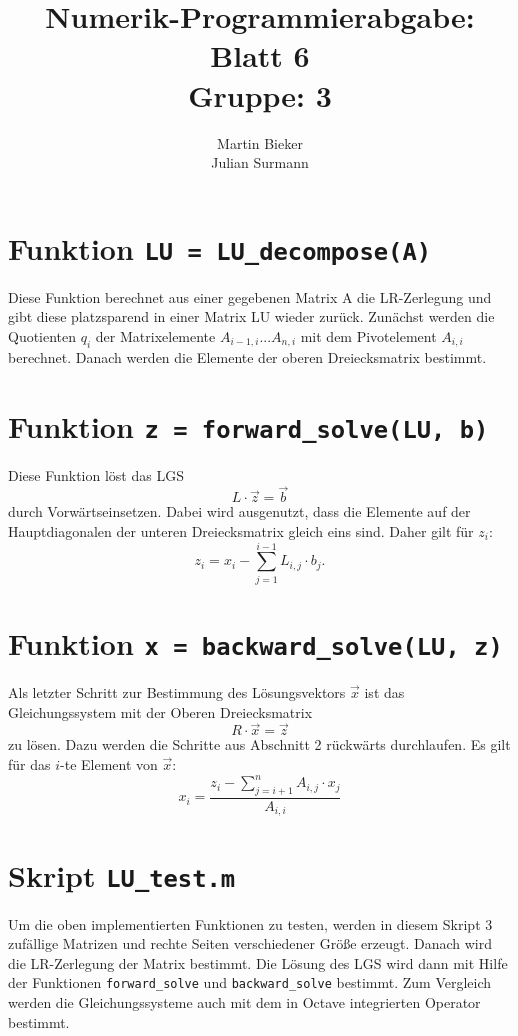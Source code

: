 \documentclass[11pt,ngerman,a4paper]{article}
\title{\textbf{Numerik-Programmierabgabe: Blatt 6}\\
Gruppe: 3}
\author{Martin Bieker\\
		Julian Surmann\\
}
\date{}
\begin{document}
\renewcommand\tablename{Tabelle}
\renewcommand\figurename{Abbildung}
\maketitle
\section{Funktion \texttt{LU = LU\_decompose(A)}}
Diese Funktion berechnet aus einer gegebenen Matrix A die LR-Zerlegung und gibt diese platzsparend in einer Matrix LU wieder zur\"uck. Zun\"achst werden die Quotienten $q_i$ der Matrixelemente $A_{i-1,i} ... A_{n,i}$ mit dem Pivotelement $A_{i,i}$ berechnet. Danach werden die Elemente der oberen Dreiecksmatrix bestimmt.


\section{Funktion \texttt{z = forward\_solve(LU, b)}}
Diese Funktion löst das LGS 
\[
L\cdot \vec z = \vec b 
\]
durch Vorw\"artseinsetzen. Dabei wird ausgenutzt, dass die Elemente auf der Hauptdiagonalen der unteren Dreiecksmatrix gleich eins sind. Daher gilt f\"ur $z_i$:
\[
z_i = x_i - \sum^{i-1}_{j=1} L_{i,j}\cdot b_j \mathrm{.}
\]



\section{Funktion \texttt{x = backward\_solve(LU, z)}}

Als letzter Schritt zur Bestimmung des L\"osungsvektors $\vec x$ ist das Gleichungssystem mit der Oberen Dreiecksmatrix
\[
R\cdot\vec x = \vec z
\]
 zu l\"osen. Dazu werden die Schritte aus Abschnitt 2 r\"uckw\"arts durchlaufen. Es gilt f\"ur das $i$-te Element von $\vec x$:
 \[
 x_i = \frac{z_i- \sum^n_{j=i +1} A_{i,j}\cdot x_j }{A_{i,i}}
 \]
 \newpage
 
 
 \section{Skript \texttt{LU\_test.m}}
 Um die oben implementierten Funktionen zu testen, werden in diesem Skript 3 zuf\"allige Matrizen und rechte Seiten verschiedener Gr\"o\ss e erzeugt. Danach wird die LR-Zerlegung der Matrix bestimmt. Die L\"osung des LGS wird dann mit Hilfe der Funktionen \texttt{forward\_solve} und \texttt{backward\_solve} bestimmt. Zum Vergleich werden die Gleichungssysteme auch mit dem in Octave integrierten Operator bestimmt.
 \newpage
 
\end{document}
